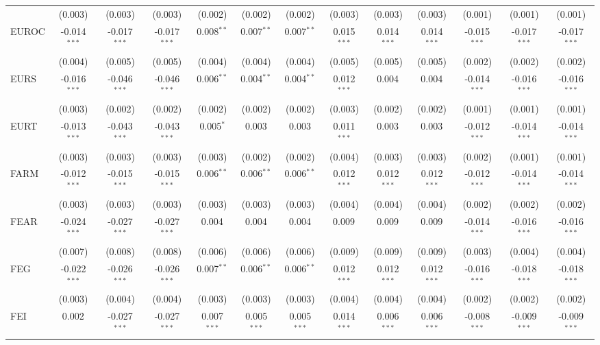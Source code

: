 \begin{table}[!htbp]
\begin{tabular}{@{\extracolsep{5pt}}lcccccccccccc}
  & (0.003) & (0.003) & (0.003) & (0.002) & (0.002) & (0.002) & (0.003) & (0.003) & (0.003) & (0.001) & (0.001) & (0.001) \\
 EUROC & -0.014$^{***}$ & -0.017$^{***}$ & -0.017$^{***}$ & 0.008$^{**}$ & 0.007$^{**}$ & 0.007$^{**}$ & 0.015$^{***}$ & 0.014$^{***}$ & 0.014$^{***}$ & -0.015$^{***}$ & -0.017$^{***}$ & -0.017$^{***}$ \\
  & (0.004) & (0.005) & (0.005) & (0.004) & (0.004) & (0.004) & (0.005) & (0.005) & (0.005) & (0.002) & (0.002) & (0.002) \\
 EURS & -0.016$^{***}$ & -0.046$^{***}$ & -0.046$^{***}$ & 0.006$^{**}$ & 0.004$^{**}$ & 0.004$^{**}$ & 0.012$^{***}$ & 0.004$^{}$ & 0.004$^{}$ & -0.014$^{***}$ & -0.016$^{***}$ & -0.016$^{***}$ \\
  & (0.003) & (0.002) & (0.002) & (0.002) & (0.002) & (0.002) & (0.003) & (0.002) & (0.002) & (0.001) & (0.001) & (0.001) \\
 EURT & -0.013$^{***}$ & -0.043$^{***}$ & -0.043$^{***}$ & 0.005$^{*}$ & 0.003$^{}$ & 0.003$^{}$ & 0.011$^{***}$ & 0.003$^{}$ & 0.003$^{}$ & -0.012$^{***}$ & -0.014$^{***}$ & -0.014$^{***}$ \\
  & (0.003) & (0.003) & (0.003) & (0.003) & (0.002) & (0.002) & (0.004) & (0.003) & (0.003) & (0.002) & (0.001) & (0.001) \\
 FARM & -0.012$^{***}$ & -0.015$^{***}$ & -0.015$^{***}$ & 0.006$^{**}$ & 0.006$^{**}$ & 0.006$^{**}$ & 0.012$^{***}$ & 0.012$^{***}$ & 0.012$^{***}$ & -0.012$^{***}$ & -0.014$^{***}$ & -0.014$^{***}$ \\
  & (0.003) & (0.003) & (0.003) & (0.003) & (0.003) & (0.003) & (0.004) & (0.004) & (0.004) & (0.002) & (0.002) & (0.002) \\
 FEAR & -0.024$^{***}$ & -0.027$^{***}$ & -0.027$^{***}$ & 0.004$^{}$ & 0.004$^{}$ & 0.004$^{}$ & 0.009$^{}$ & 0.009$^{}$ & 0.009$^{}$ & -0.014$^{***}$ & -0.016$^{***}$ & -0.016$^{***}$ \\
  & (0.007) & (0.008) & (0.008) & (0.006) & (0.006) & (0.006) & (0.009) & (0.009) & (0.009) & (0.003) & (0.004) & (0.004) \\
 FEG & -0.022$^{***}$ & -0.026$^{***}$ & -0.026$^{***}$ & 0.007$^{**}$ & 0.006$^{**}$ & 0.006$^{**}$ & 0.012$^{***}$ & 0.012$^{***}$ & 0.012$^{***}$ & -0.016$^{***}$ & -0.018$^{***}$ & -0.018$^{***}$ \\
  & (0.003) & (0.004) & (0.004) & (0.003) & (0.003) & (0.003) & (0.004) & (0.004) & (0.004) & (0.002) & (0.002) & (0.002) \\
 FEI & 0.002$^{}$ & -0.027$^{***}$ & -0.027$^{***}$ & 0.007$^{***}$ & 0.005$^{***}$ & 0.005$^{***}$ & 0.014$^{***}$ & 0.006$^{***}$ & 0.006$^{***}$ & -0.008$^{***}$ & -0.009$^{***}$ & -0.009$^{***}$ \\

\end{tabular}
\end{table}
